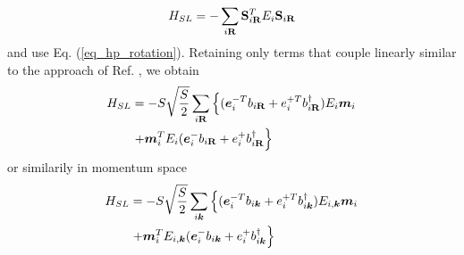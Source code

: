 \documentclass[aps,prl,twocolumn,superscriptaddress,amsmath,amssymb,floats,aps,10pt]{revtex4-1}
\begin{document}
\begin{equation}
 H_{SL}=-\sum_{i\bf R} {\bf S}_{i\bf R}^T  E_i {\bf S}_{i\bf R}
\end{equation}
and use Eq. (\ref{eq_hp_rotation}). Retaining only terms that couple linearly similar to the approach of Ref. , we obtain
\begin{align}
  H_{SL}&=-S\sqrt{\frac S2} \sum_{i\bf R} \left\{(\bm e_i^{-T} b_{i\bf R}+e_i^{+T}b_{i\bf R}^\dagger)E_i \bm m_i \right.\\
  &\left. +\bm m_i^T E_i (\bm e_i^{-} b_{i\bf R}+e_i^{+}b_{i\bf R}^\dagger\right\}
\end{align}
or similarily in momentum space
\begin{align}
  H_{SL}&=-S\sqrt{\frac S2} \sum_{i\bm k} \left\{(\bm e_i^{-T} b_{i\bm k}+e_i^{+T}b_{i\bm k}^\dagger) E_{i,\bm k} \bm m_i \right.\\
  &\left. +\bm m_i^T E_{i,\bm k} (\bm e_i^{-} b_{i\bm k}+e_i^{+}b_{i\bm k}^\dagger\right\}
\end{align}
\end{document}
